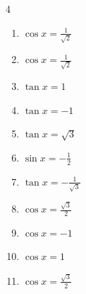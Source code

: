 \begin{multicols}{4}
\begin{enumerate}
  \item $\displaystyle \cos{x}  = \frac{1}{\sqrt{2}}$


  \item $\displaystyle \cos{x}  = \frac{1}{\sqrt{2}}$


  \item $\displaystyle \tan{x}  = 1$


  \item $\displaystyle \tan{x}  = -1$


  \item $\displaystyle \tan{x}  = \sqrt{3}$


  \item $\displaystyle \sin{x}  = -\frac{1}{2}$


  \item $\displaystyle \tan{x}  = -\frac{1}{\sqrt{3}}$


  \item $\displaystyle \cos{x}  = \frac{\sqrt{3}}{2}$


  \item $\displaystyle \cos{x}  = -1$

        \phantom{$\displaystyle x = \pi$}

  \item $\displaystyle \cos{x}  = 1$

        \phantom{$\displaystyle x = 0$}

  \item $\displaystyle \cos{x}  = \frac{\sqrt{3}}{2}$


\columnbreak %


\end{enumerate}
\end{multicols}
